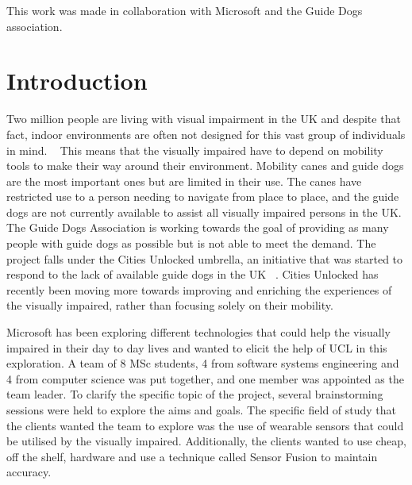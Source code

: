 \documentclass[prodmode,acmtosem]{acmsmall} %
\begin{document}


\begin{bottomstuff}
This work was made in collaboration with Microsoft and the Guide Dogs association.
\end{bottomstuff}

\maketitle

\section{Introduction}
Two million people are living with visual impairment in the UK and despite that fact, indoor environments are often not designed for this vast group of individuals in mind. ~\cite{NHSBlindStatistics} This means that the visually impaired have to depend on mobility tools to make their way around their environment. Mobility canes and guide dogs are the most important ones but are limited in their use. The canes have restricted use to a person needing to navigate from place to place, and the guide dogs are not currently available to assist all visually impaired persons in the UK. The Guide Dogs Association is working towards the goal of providing as many people with guide dogs as possible but is not able to meet the demand. The project falls under the Cities Unlocked umbrella, an initiative that was started to respond to the lack of available guide dogs in the UK ~\cite{CitiesUnlockedGeneral}. Cities Unlocked has recently been moving more towards improving and enriching the experiences of the visually impaired, rather than focusing solely on their mobility.

Microsoft has been exploring different technologies that could help the visually impaired in their day to day lives and wanted to elicit the help of UCL in this exploration. A team of 8 MSc students, 4 from software systems engineering and 4 from computer science was put together, and one member was appointed as the team leader. To clarify the specific topic of the project, several brainstorming sessions were held to explore the aims and goals. The specific field of study that the clients wanted the team to explore was the use of wearable sensors that could be utilised by the visually impaired. Additionally, the clients wanted to use cheap, off the shelf, hardware and use a technique called Sensor Fusion to maintain accuracy.
\end{document}
